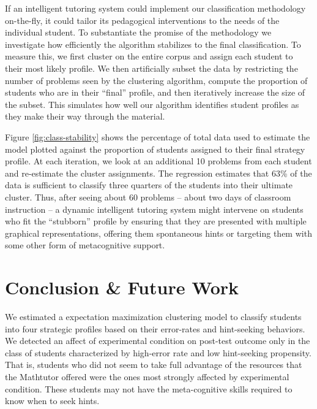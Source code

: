 \documentclass{edm_template}
\begin{document}
If an intelligent tutoring system could implement our classification methodology on-the-fly, it could tailor its pedagogical interventions to the needs of the individual student. To substantiate the promise of the methodology we investigate how efficiently the algorithm stabilizes to the final classification. To measure this, we first cluster on the entire corpus and assign each student to their most likely profile. We then artificially subset the data by restricting the number of problems seen by the clustering algorithm, compute the proportion of students who are in their ``final'' profile, and then iteratively increase the size of the subset. This simulates how well our algorithm identifies student profiles as they make their way through the material. 

Figure \ref{fig:class-stability} shows the percentage of total data used to estimate the model plotted against the proportion of students assigned to their final strategy profile. At each iteration, we look at an additional 10 problems from each student and re-estimate the cluster assignments. The regression estimates that 63\% of the data is sufficient to classify three quarters of the students into their ultimate cluster. Thus, after seeing about 60 problems -- about two days of classroom instruction -- a dynamic intelligent tutoring system might intervene on students who fit the ``stubborn'' profile by ensuring that they are presented with multiple graphical representations, offering them spontaneous hints or targeting them with some other form of metacognitive support. 

\section{Conclusion \& Future Work}
\label{sec:conclusion}

We estimated a expectation maximization clustering model to classify students into four strategic profiles based on their error-rates and hint-seeking behaviors. We detected an affect of experimental condition on post-test outcome only in the class of students characterized by high-error rate and low hint-seeking propensity. That is, students who did not seem to take full advantage of the resources that the Mathtutor offered were the ones most strongly affected by experimental condition. These students may not have the meta-cognitive skills required to know when to seek hints. 
\end{document}
